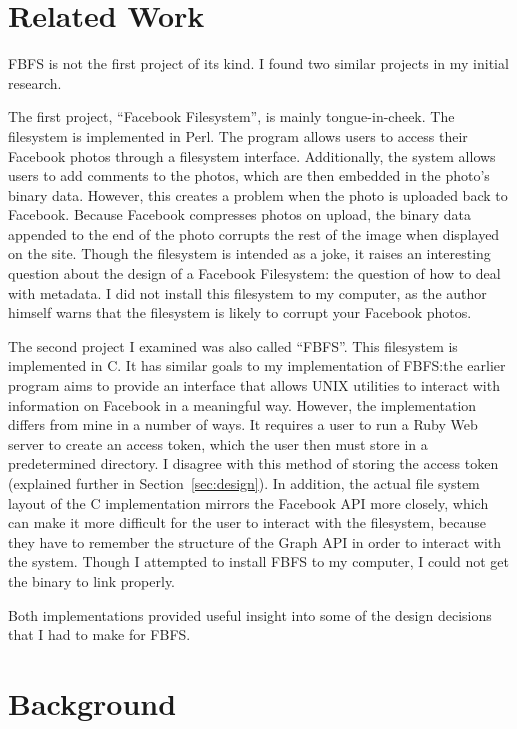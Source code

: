 \documentclass[11pt,twocolumn]{article}
\begin{document}
\section{Related Work}

FBFS is not the first project of its kind. I found two similar projects in my
initial research.

The first project, ``Facebook Filesystem'', is mainly
tongue-in-cheek\cite{fbfsperl}. The filesystem is implemented in Perl. The
program allows users to access their Facebook photos through a filesystem
interface. Additionally, the system allows users to add comments to the photos,
which are then embedded in the photo's binary data. However, this creates a
problem when the photo is uploaded back to Facebook. Because Facebook
compresses photos on upload, the binary data appended to the end of the photo
corrupts the rest of the image when displayed on the site. Though the
filesystem is intended as a joke, it raises an interesting question about the
design of a Facebook Filesystem: the question of how to deal with metadata. I
did not install this filesystem to my computer, as the author himself warns
that the filesystem is likely to corrupt your Facebook photos.

The second project I examined was also called ``FBFS''\cite{fbfsc}. This
filesystem is implemented in C. It has similar goals to my implementation of
FBFS:\@ the earlier program aims to provide an interface that allows UNIX
utilities to interact with information on Facebook in a meaningful way.
However, the implementation differs from mine in a number of ways. It requires
a user to run a Ruby Web server to create an access token, which the user then
must store in a predetermined directory. I disagree with this method of storing
the access token (explained further in Section~\ref{sec:design}). In addition,
the actual file system layout of the C implementation mirrors the Facebook API
more closely, which can make it more difficult for the user to interact with
the filesystem, because they have to remember the structure of the Graph API in
order to interact with the system. Though I attempted to install FBFS to my
computer, I could not get the binary to link properly.

Both implementations provided useful insight into some of the design decisions
that I had to make for FBFS\@.


\section{Background}
\label{sec:background}
\end{document}
